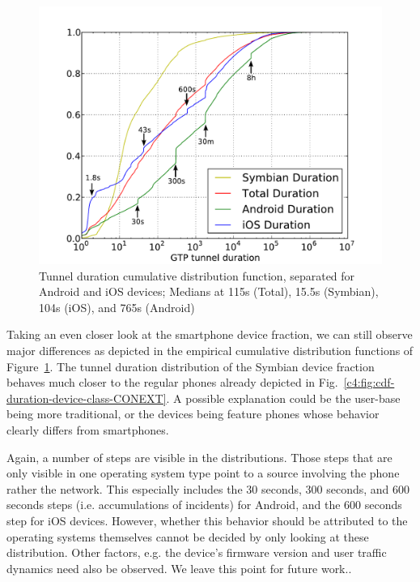 
\begin{figure}[htbp]
	\centering
	\includegraphics[width=\textwidth]{images/tunnel-dur-os-cdf-mod.pdf}
	\caption{Tunnel duration cumulative distribution function, separated for Android and iOS devices; Medians at 115s (Total), 15.5s (Symbian), 104s (iOS), and 765s (Android)}
	\label{c4:fig:cdf-duration-os-CONEXT}
\end{figure}

Taking an even closer look at the smartphone device fraction, we can still observe major differences as depicted in the empirical cumulative distribution functions of Figure~\ref{c4:fig:cdf-duration-os-CONEXT}. The tunnel duration distribution of the Symbian device fraction behaves much closer to the regular phones already depicted in Fig.~\ref{c4:fig:cdf-duration-device-class-CONEXT}. A possible explanation could be the user-base being more traditional, or the devices being feature phones whose behavior clearly differs from smartphones.

Again, a number of steps are visible in the distributions. %
Those steps that are only visible in one operating system type point to a source involving the phone rather the network. This especially includes the 30 seconds, 300 seconds, and 600 seconds steps (i.e. accumulations of incidents) for Android, and the 600 seconds step for iOS devices. However, whether this behavior should be attributed to the operating systems themselves cannot be decided by only looking at these distribution. Other factors, e.g. the device's firmware version and user traffic dynamics need also be observed. We leave this point for future work..

